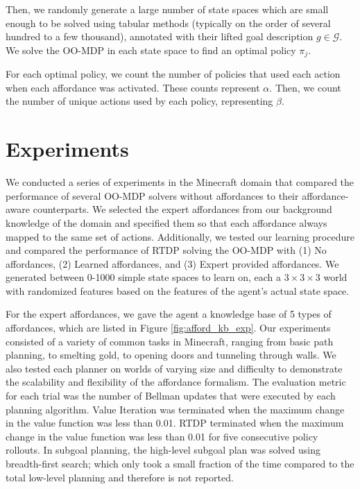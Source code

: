 \documentclass[conference]{IEEEtran}
\begin{document}
Then, we randomly generate a large number of state spaces which are small 
enough to be solved using tabular methods (typically on the order of several hundred to a few thousand), 
annotated with their lifted goal description $g \in \mathcal{G}$. We solve the 
OO-MDP in each state space to find an optimal policy $\pi_j$.

For each optimal policy, we count the number of policies that used each action 
when each affordance was activated.
These counts represent $\alpha$. Then, we count the number of unique actions used by each policy, representing $\beta$. 

\section{Experiments}
\label{sec:experiments}

We conducted a series of experiments in the Minecraft domain that
compared the performance of several OO-MDP solvers without affordances
to their affordance-aware counterparts. We selected the expert
affordances from our background knowledge of the domain and specified them 
so that each affordance always mapped to the same set of actions. Additionally, we
tested our learning procedure and compared the performance of RTDP solving the OO-MDP
with (1) No affordances, (2) Learned affordances, and (3) Expert provided affordances. We generated between 0-1000 simple state
spaces to learn on, each a $3\times3\times3$ world with randomized features based on the features of the agent's actual state space.

For the expert affordances, we gave the agent a knowledge base of 5 types of affordances,
which are listed in Figure \ref{fig:afford_kb_exp}.  Our experiments
consisted of a variety of common tasks in Minecraft, ranging from
basic path planning, to smelting gold, to opening doors and tunneling
through walls.  We also tested each planner on worlds of varying size
and difficulty to demonstrate the scalability and flexibility of the
affordance formalism. The evaluation metric for each trial was the
number of Bellman updates that were executed by each planning
algorithm. Value Iteration was terminated when the maximum change in
the value function was less than 0.01. RTDP terminated when the
maximum change in the value function was less than 0.01 for five
consecutive policy rollouts. In subgoal planning, the high-level
subgoal plan was solved using breadth-first search; which only took a
small fraction of the time compared to the total low-level planning
and therefore is not reported.
\end{document}
